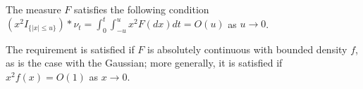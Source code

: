 \begin{ass} \label{as:nu}
  \mbox{}
  The \levy measure $F$ satisfies the following condition
  $(x^2I_{\{\vert x \vert \le u\}})\ast \nu_t = \int_0^t \int_{-u}^{u} x^2 F(dx) dt = O(u)$ as $u \to 0$.
\end{ass}
\begin{remark}

  The  requirement  is satisfied if $F$ is absolutely continuous with bounded density $f$, as is the case with the Gaussian; more generally, it is satisfied  if  $x^2 f(x) = O(1)$ as $x \to 0$.
\end{remark}
